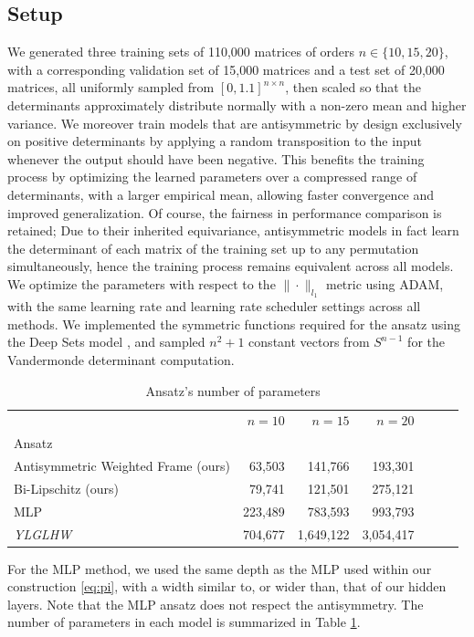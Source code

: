 \documentclass{amsart}
\theoremstyle{plain}
\theoremstyle{definition}
\theoremstyle{remark}
\begin{document}
\subsection{Setup} \label{exp_setup}
We generated three training sets of 110,000 matrices of orders $n \in \{10, 15, 20\}$, with a corresponding validation set of 15,000 matrices and a test set of 20,000 matrices, all uniformly sampled from $\left[0, 1.1\right]^{n \times n}$, then scaled so that the determinants approximately distribute normally with a non-zero mean and higher variance. We moreover train models that are antisymmetric by design exclusively on positive determinants by applying a random transposition to the input whenever the output should have been negative. This benefits the training process by optimizing the learned parameters over a compressed range of determinants, with a larger empirical mean, allowing faster convergence and improved generalization. Of course, the fairness in performance comparison is retained; Due to their inherited equivariance, antisymmetric models in fact learn the determinant of each matrix of the training set up to any permutation simultaneously, hence the training process remains equivalent across all models. We optimize the parameters with respect to the $\|\cdot\|_{l_1}$ metric using ADAM, with the same learning rate and learning rate scheduler settings across all methods. We implemented the symmetric functions required for the ansatz \cite{ye2024widetilde} using the Deep Sets model \cite{zaheer2017deep}, and sampled $n^2 + 1$ constant vectors from $S^{n-1}$ for the Vandermonde determinant computation.

\begin{table}[h]
\centering
\begin{tabular}{lrrrrrr}
\toprule
 &$n = 10$ & $n = 15$ & $n = 20$ \\
Ansatz &  &  &  &  &  &  \\
\midrule
Antisymmetric Weighted Frame (ours) & 63,503 & 141,766 & 193,301 \\
Bi-Lipschitz (ours) & 79,741 & 121,501 & 275,121 \\
MLP & 223,489 & 783,593 & 993,793 \\
\textit{YLGLHW} \cite{ye2024widetilde} & 704,677 & 1,649,122 & 3,054,417\\
\bottomrule
\end{tabular}
\caption{Ansatz's number of parameters}
 \label{exp:params}
\end{table}
For the MLP method, we used the same depth as the MLP used within our construction \ref{eq:pi}, with a width similar to, or wider than, that of our hidden layers. %
Note that the MLP ansatz does not respect the antisymmetry.
The number of parameters in each model is summarized in Table \ref{exp:params}.
 
\end{document}
